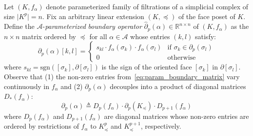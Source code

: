 \documentclass[10pt]{article}
\numberwithin{equation}{section}
\newcommand{\+}{%
	\raisebox{0.18ex}{\scaleobj{0.55}{+}}
}
\theoremstyle{definition}
\newtheorem{definition}{Definition}
\theoremstyle{definition}
\begin{document}
Let $(K, f_\alpha)$ denote parameterized family of filtrations of a simplicial complex of size $\lvert K^p \rvert = n$. Fix an arbitrary linear extension $(K, \preceq)$ of the face poset of $K$. 
Define the $\mathcal{A}$-\emph{parameterized} \emph{boundary operator} $\hat{\partial}_p(\alpha) \in \mathbb{R}^{n \times n}$ of $(K, f_\alpha)$ as the $n \times n$ matrix ordered by $\preceq$ for all $\alpha \in \mathcal{A}$ whose entries $(k,l)$ satisfy:
\begin{equation}\label{eq:param_boundary_matrix}
	\partial_p(\alpha)[k,l] = \begin{cases}
s_{kl} \cdot f_\alpha(\sigma_k) \cdot f_\alpha(\sigma_l) & \text{if } \sigma_k \in \partial_p(\sigma_l)\\
	0 & \text{otherwise}
\end{cases}
\end{equation}
where $s_{kl} = \mathrm{sgn}([\sigma_k], \partial [\sigma_l])$ is the sign of the oriented face $[\sigma_k]$ in $\partial[\sigma_l]$.
\noindent
Observe that (1) the non-zero entries from~\eqref{eq:param_boundary_matrix} vary continuously in $f_\alpha$ and (2) $\partial_p(\alpha)$ decouples into a product of diagonal matrices $D_\ast(f_\alpha)$: 
	\begin{equation}\label{eq:decouple}
		\partial_p(\alpha) \triangleq D_p(f_\alpha) \cdot \partial_p(K_\preceq) \cdot D_{p+1}(f_\alpha) 
	\end{equation}
	where $D_p(f_\alpha)$ and  $D_{p+1}(f_\alpha)$ are diagonal matrices whose non-zero entries are ordered by restrictions of $f_\alpha$ to $K_\preceq^p$ and $K_\preceq^{p+1}$, respectively.
\end{document}
